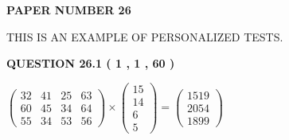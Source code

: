 \documentclass[12pt]{article}
\begin{document}
 
 
   
   
\newpage 
\setcounter{page}{ 
    26001 } 
   
   
   
   
 {\textbf{ \Large{ PAPER NUMBER           26  }}}
   
   
\vspace{0.2in}
   
   
   
   
   
   
 \vspace{0.2in}
{\Huge  THIS IS AN EXAMPLE OF}
{\Huge  PERSONALIZED TESTS. }
   
   
  
\vspace{0.2in}
  
{\textbf{\Large{QUESTION
26.1 
 (           1 ,           1 ,          60 )
}}}
  
  
 
 
\noindent{}

 
$\left( \begin{array}{ccccccccccccccc}
          32  & 
          41  & 
          25  & 
          63  \\ 
          60  & 
          45  & 
          34  & 
          64  \\ 
          55  & 
          34  & 
          53  & 
          56
\end{array}\right) \times
\left( \begin{array}{c}
          15  \\ 
          14  \\ 
           6  \\ 
           5
\end{array}\right)  =
\left( \begin{array}{c}
        1519  \\ 
        2054  \\ 
        1899
\end{array}\right)  $
 
\end{document}
